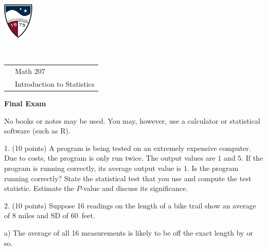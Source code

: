 \documentclass[10pt]{article}
\begin{document}
\vfill
\eject



\href{http://www.su.edu}{\includegraphics[height=1.75cm]{sulogo.eps}}
\vspace{-1.69cm}

{{\ }\hfill\small
\begin{tabular}{cl}
& Math 207\\
& Introduction to Statistics\\
\end{tabular}
}

\begin{center}
\textbf{\large  Final Exam}
\end{center}
No books or notes  may be used. You may, however, use a calculator or statistical software (such as R).
\medskip

1. (10 points)  A program is being tested on an extremely expensive computer.  
Due to costs, the program is only run twice.  The output values are $1$ and $5$.
If the  program is running correctly, its average output value is $1$.
Is the program running correctly?  State the statistical test that you use and
compute the test statistic.  Estimate the $P$-value and discuss its significance.
\vspace{3.7in}


2. (10 points)
Suppose 16 readings on the length of a bike trail show an average of 8 miles and  SD
of 60~feet.
\medskip

\hspace{10pt} a) The average of all 16 measurements is likely to be off
the exact length by \underline{\hspace{1in}} or so.
\vspace{0.7in}
%
\end{document}
